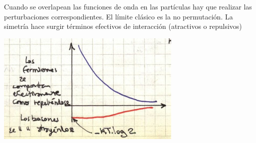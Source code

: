\documentclass[10pt,oneside]{CBFT_book}
\begin{document}
Cuando se overlapean las funciones de onda en las partículas hay que realizar las perturbaciones 
correspondientes.
El límite clásico es la no permutación. La simetría hace surgir términos efectivos de interacción
(atractivos o repulsivos)

\includegraphics[scale=0.5]{images/1606329560.jpg}
\end{document}
